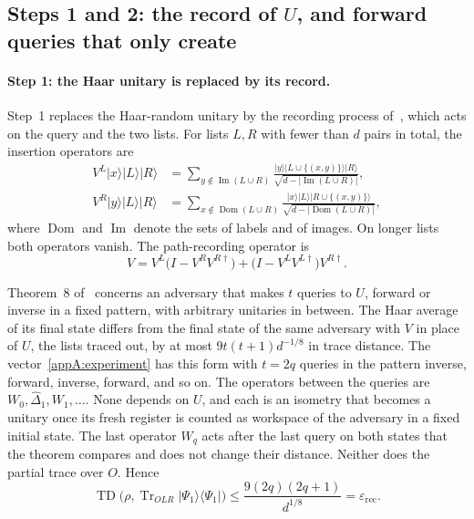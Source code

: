 \documentclass[11pt,letterpaper]{article}
\theoremstyle{definition}\newtheorem{definition}[theorem]{Definition}
\newcommand{\Tr}{\operatorname{Tr}}
\newcommand{\TD}{\operatorname{TD}}
\newcommand{\Dom}{\operatorname{Dom}}
\newcommand{\Img}{\operatorname{Im}}
\newcommand{\ket}[1]{\lvert#1\rangle}
\newcommand{\bra}[1]{\langle#1\rvert}
\newcommand{\proj}[1]{\ket{#1}\!\bra{#1}}
\begin{document}
\subsection{Steps 1 and 2: the record of \texorpdfstring{$U$}{U}, and forward queries that only create}\label{sec:c6-A1}

\paragraph{Step 1: the Haar unitary is replaced by its record.}
Step~1 replaces the Haar-random unitary by the recording process
of~\cite{mahuang2025}, which acts on the query and the two lists. For
lists $L,R$ with fewer than $d$ pairs in total, the
insertion operators are
\begin{equation}\label{eq:c6-source-creators}
\begin{aligned}
 V^L\ket{x}\ket{L}\ket{R}
 &=\sum_{y\notin\Img(L\cup R)}
    \frac{\ket{y}\ket{L\cup\{(x,y)\}}\ket{R}}
    {\sqrt{d-|\Img(L\cup R)|}},\\
 V^R\ket{y}\ket{L}\ket{R}
 &=\sum_{x\notin\Dom(L\cup R)}
    \frac{\ket{x}\ket{L}\ket{R\cup\{(x,y)\}}}
    {\sqrt{d-|\Dom(L\cup R)|}},
\end{aligned}
\end{equation}
where $\Dom$ and $\Img$ denote the sets of labels and of images. On
longer lists both operators vanish. The path-recording
operator is
\begin{equation}\label{eq:c6-recording-V}
 V=V^L\bigl(I-V^RV^{R\dagger}\bigr)
   +\bigl(I-V^LV^{L\dagger}\bigr)V^{R\dagger}.
\end{equation}

Theorem~8 of~\cite{mahuang2025} concerns an adversary that makes $t$
queries to $U$, forward or inverse in a fixed pattern, with arbitrary
unitaries in between. The Haar average of its final state differs from
the final state of the same adversary with $V$ in place of $U$, the
lists traced out, by at most $9t(t+1)d^{-1/8}$ in trace distance. The
vector~\eqref{appA:experiment} has this form with $t=2q$ queries in the
pattern inverse, forward, inverse, forward, and so on. The operators
between the queries are $W_0,\widehat\Delta_1,W_1,\dots$. None depends
on $U$, and each is an isometry that becomes a unitary once its fresh
register is counted as workspace of the adversary in a fixed initial
state. The last operator $W_q$ acts after the last query on both states
that the theorem compares and does not change their distance. Neither
does the partial trace over $O$. Hence
\[
 \TD\bigl(\rho,\Tr_{OLR}\proj{\Psi_1}\bigr)\le
 \frac{9(2q)(2q+1)}{d^{1/8}}=\varepsilon_{\mathrm{rec}} .
\]
\end{document}
